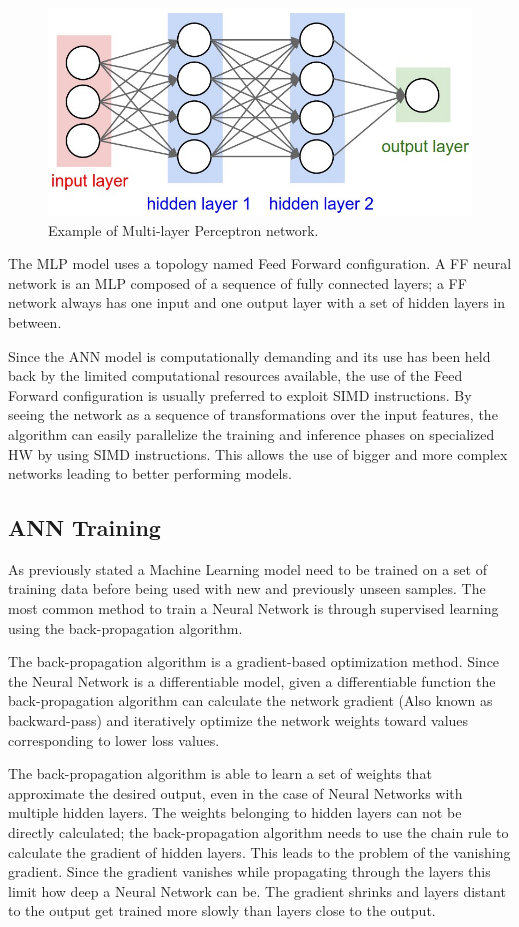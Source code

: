 \documentclass[../main.tex]{subfiles}
\begin{document}
\begin{figure}[h!]
  \centering
  \includegraphics[width=.6\linewidth]{images/neural_net2.jpeg}
  \caption{Example of Multi-layer Perceptron network. \cite{CS231n}}
  \label{fig:MLP}
\end{figure}

The MLP model uses a topology named Feed Forward configuration. 
A FF neural network is an MLP composed of a sequence of fully connected layers; a FF network always has one input and one output layer with a set of hidden layers in between.

Since the ANN model is computationally demanding and its use has been held back by the limited computational resources available, the use of the Feed Forward configuration is usually preferred to exploit SIMD instructions.
By seeing the network as a sequence of transformations over the input features, the algorithm can easily parallelize the training and inference phases on specialized HW by using SIMD instructions.
This allows the use of bigger and more complex networks leading to better performing models.


\subsection{ANN Training}
As previously stated a Machine Learning model need to be trained on a set of training data before being used with new and previously unseen samples.
The most common method to train a Neural Network is through supervised learning using the back-propagation algorithm.

The back-propagation algorithm is a gradient-based optimization method.
Since the Neural Network is a differentiable model, given a differentiable function the back-propagation algorithm can calculate the network gradient (Also known as backward-pass) and iteratively optimize the network weights toward values corresponding to lower loss values.

The back-propagation algorithm is able to learn a set of weights that approximate the desired output, even in the case of Neural Networks with multiple hidden layers.
The weights belonging to hidden layers can not be directly calculated; the back-propagation algorithm needs to use the chain rule to calculate the gradient of hidden layers.
This leads to the problem of the vanishing gradient.
Since the gradient vanishes while propagating through the layers this limit how deep a Neural Network can be. 
The gradient shrinks and layers distant to the output get trained more slowly than layers close to the output.
\end{document}
